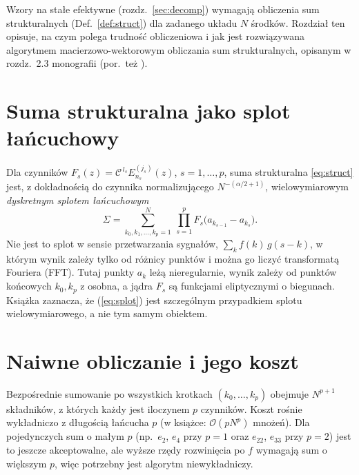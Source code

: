 \documentclass[12pt,a4paper,twoside,openright]{report}
\theoremstyle{definition}
\theoremstyle{remark}
\begin{document}
{\color{green!50!black}
Wzory na stałe efektywne (rozdz.~\ref{sec:decomp}) wymagają obliczenia sum strukturalnych (Def.~\ref{def:struct}) dla zadanego układu $N$ środków. Rozdział ten opisuje, na czym polega trudność obliczeniowa i jak jest rozwiązywana algorytmem macierzowo-wektorowym obliczania sum strukturalnych, opisanym w rozdz.~2.3 monografii \cite{drygas2019applied} (por.\ też \cite{nawalaniec2020effective}).

\section{Suma strukturalna jako splot łańcuchowy}
Dla czynników $F_s(z)=\mathcal C^{\,l_s}E^{(j_s)}_{n_s}(z)$, $s=1,\dots,p$, suma strukturalna \eqref{eq:struct} jest, z dokładnością do czynnika normalizującego $N^{-(\alpha/2+1)}$, wielowymiarowym \emph{dyskretnym splotem łańcuchowym}
\begin{equation}\label{eq:splot}
\Sigma=\sum_{k_0,k_1,\dots,k_p=1}^{N}\ \prod_{s=1}^{p}F_s\bigl(a_{k_{s-1}}-a_{k_s}\bigr).
\end{equation}
Nie jest to splot w sensie przetwarzania sygnałów, $\sum_k f(k)\,g(s-k)$, w którym wynik zależy tylko od różnicy punktów i można go liczyć transformatą Fouriera (FFT). Tutaj punkty $a_k$ leżą nieregularnie, wynik zależy od punktów końcowych $k_0,k_p$ z osobna, a jądra $F_s$ są funkcjami eliptycznymi o biegunach. Książka \cite{drygas2019applied} zaznacza, że (\ref{eq:splot}) jest szczególnym przypadkiem splotu wielowymiarowego, a nie tym samym obiektem.

\section{Naiwne obliczanie i jego koszt}
Bezpośrednie sumowanie po wszystkich krotkach $(k_0,\dots,k_p)$ obejmuje $N^{p+1}$ składników, z których każdy jest iloczynem $p$ czynników. Koszt rośnie wykładniczo z długością łańcucha $p$ (w książce: $\mathcal O(pN^{p})$ mnożeń). Dla pojedynczych sum o małym $p$ (np.\ $e_2$, $e_4$ przy $p=1$ oraz $e_{22}$, $e_{33}$ przy $p=2$) jest to jeszcze akceptowalne, ale wyższe rzędy rozwinięcia po $f$ wymagają sum o większym $p$, więc potrzebny jest algorytm niewykładniczy.

}
\end{document}
